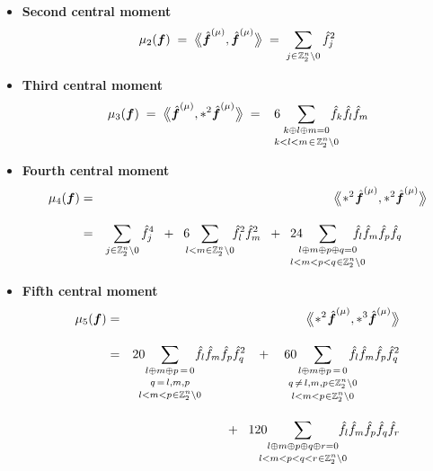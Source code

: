 \documentclass[letterpaper,11pt]{article}
\newcommand{\bs}[1]{{\boldsymbol{#1}}}
\newcommand{\gr}[1]{( #1 )}
\newcommand{\Int}{\mathbb Z}
\newcommand{\conv}{\ast}
\newcommand{\dimin}[2]{{ #1 }^{\gr{#2}}}
\newcommand{\Dotprod}[2]{\big\langle\!\:\!\!\big\langle #1, #2 \big\rangle\!\:\!\!\big\rangle}
\newcommand{\hatbsf}{{\kern+0.25em}\hat{{\kern-0.25em}\bs{f}}}
\theoremstyle{definition} \newtheorem{remark}{Remark}
\begin{document}
\begin{itemize}
\item \textbf{Second central moment}
\begin{equation} \label{Eq:mu2_f_Z2n}
\mu_2\gr{\bs{f}} \;=\;
\Dotprod{\dimin{\hatbsf}{\mu}}{\dimin{\hatbsf}{\mu}}
\;=\; \sum_{j \in \:\! \Int_2^n\backslash0} \hat{f}_j^2
\end{equation}

\item \textbf{Third central moment}
\begin{equation} \label{Eq:mu3_f_Z2n}
\mu_3\gr{\bs{f}} \;=\;
\Dotprod{\dimin{\hatbsf}{\mu}}{\conv^2 \dimin{\hatbsf}{\mu}}
\;=\; \;\; 6\!\!\!\! \sum_{\substack{k \oplus l \oplus m = 0\\[2pt] k<l<m \;\!\in\;\! \Int_2^n\backslash0}} \!\!\!\!\!\hat{f}_k \hat{f}_l \hat{f}_m
\end{equation}

\item \textbf{Fourth central moment}
\begin{eqnarray} \label{Eq:mu4_f_Z2n}
\mu_4\gr{\bs{f}} &=&
\Dotprod{\!\conv^2 \!\dimin{\hatbsf}{\mu}}{\conv^2 \dimin{\hatbsf}{\mu}} \nonumber \\[10pt]
&=&
\sum_{j \in \Int_2^n\backslash0} \hat{f}_j^4 \;\;+\;\; 6 \!\!\!\sum_{l < m \in \Int_2^n\backslash0} \!\!\hat{f}_l^2 \hat{f}_m^2
\;\;+\;\; 24\!\!\!\!\!\!\!\sum_{\substack{l \oplus m \oplus p \oplus q = 0 \\[2pt] l<m<p<q \:\!\in \Int_2^n\backslash0}} \!\!\!\!\!\!\! \hat{f}_l \hat{f}_m \hat{f}_p \hat{f}_q \qquad
\end{eqnarray}

\item \textbf{Fifth central moment}
\begin{eqnarray} \label{Eq:mu5_f_Z2n}
\mu_5\gr{\bs{f}} &=&
\Dotprod{\!\conv^2 \!\dimin{\hatbsf}{\mu}}{\conv^3 \dimin{\hatbsf}{\mu}} \nonumber \\[10pt]
&=&
20\!\!\!\!\sum_{\substack{l \oplus m \oplus p \,=\, 0 \\[2pt] \substack{q\,=\,l,m,p \\[2pt] l<m<p \:\!\in \Int_2^n\backslash0}}} \!\!\!\! \hat{f}_l \hat{f}_m \hat{f}_p \hat{f}_q^2
        \;\;\;+\;\;\;\,
60\!\!\!\!\!\sum_{\substack{l \oplus m \oplus p \,=\, 0 \\[2pt] \substack{q\,\neq\,l,m,p \:\!\in \Int_2^n\backslash0\\[2pt] l<m<p \:\!\in \Int_2^n\backslash0}}} \!\!\!\!\! \hat{f}_l \hat{f}_m \hat{f}_p \hat{f}_q^2 \nonumber \\[10pt]
&&
\qquad\qquad + \;\;\; 120\!\!\!\!\!\sum_{\substack{l \oplus m \oplus p \oplus q \oplus r= 0 \\[2pt] l<m<p<q<r \:\!\in \Int_2^n\backslash0}} \!\!\!\!\! \hat{f}_l \hat{f}_m \hat{f}_p \hat{f}_q \hat{f}_r
\end{eqnarray}


\end{itemize}
\end{document}
